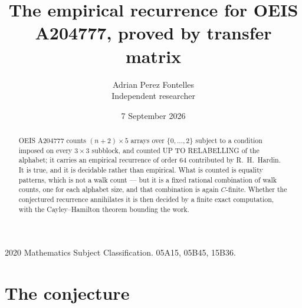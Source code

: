 \documentclass[11pt,a4paper]{article}
\title{The empirical recurrence for OEIS A204777, proved by transfer matrix}
\author{Adrian Perez Fontelles\\ \small Independent researcher}
\date{7 September 2026}
\theoremstyle{plain}
\theoremstyle{definition}
\begin{document}
\maketitle

\begin{abstract}
OEIS A204777 counts $(n+2)\times5$ arrays over $\{0,\dots,2\}$ subject to a condition imposed on
every $3\times3$ subblock, and counted UP TO RELABELLING of the
alphabet; it carries an empirical recurrence of order $64$ contributed by
R.~H.~Hardin. It is true, and it is decidable rather than empirical. What is counted is
equality patterns, which is not a walk count --- but it is a fixed rational combination of
walk counts, one for each alphabet size, and that combination is again $C$-finite. Whether the
conjectured recurrence annihilates it is then decided by a finite exact computation, with the
Cayley--Hamilton theorem bounding the work.
\end{abstract}

\noindent\small 2020 Mathematics Subject Classification. 05A15, 05B45, 15B36.\normalsize

\section{The conjecture}
\end{document}
